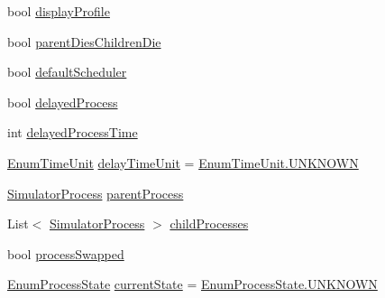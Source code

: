 \begin{DoxyCompactItemize}
\item 
bool \hyperlink{class_c_p_u___o_s___simulator_1_1_operating___system_1_1_simulator_process_a7074283e2d023d83df86651f98da7003}{display\+Profile}
\item 
bool \hyperlink{class_c_p_u___o_s___simulator_1_1_operating___system_1_1_simulator_process_a4be3ead7d12ef8390cc2f0a3a0164efa}{parent\+Dies\+Children\+Die}
\item 
bool \hyperlink{class_c_p_u___o_s___simulator_1_1_operating___system_1_1_simulator_process_ab52228f4f5902049430dc58c0c7408c3}{default\+Scheduler}
\item 
bool \hyperlink{class_c_p_u___o_s___simulator_1_1_operating___system_1_1_simulator_process_a1f62a5a6071d0525b8dea84e9205a591}{delayed\+Process}
\item 
int \hyperlink{class_c_p_u___o_s___simulator_1_1_operating___system_1_1_simulator_process_a17a480e988d10e48af5478b5ebe0794d}{delayed\+Process\+Time}
\item 
\hyperlink{namespace_c_p_u___o_s___simulator_1_1_operating___system_a0553d0bc2513aec52caa769acf994d5c}{Enum\+Time\+Unit} \hyperlink{class_c_p_u___o_s___simulator_1_1_operating___system_1_1_simulator_process_aa2ff3f17dc017fb3ad5285e85661ab47}{delay\+Time\+Unit} = \hyperlink{namespace_c_p_u___o_s___simulator_1_1_operating___system_aea0b669d1bbf5690ae34ac2f8bef9470a696b031073e74bf2cb98e5ef201d4aa3}{Enum\+Time\+Unit.\+U\+N\+K\+N\+O\+W\+N}
\item 
\hyperlink{class_c_p_u___o_s___simulator_1_1_operating___system_1_1_simulator_process}{Simulator\+Process} \hyperlink{class_c_p_u___o_s___simulator_1_1_operating___system_1_1_simulator_process_afd143112dcfa59dbc1cab80f65cf685f}{parent\+Process}
\item 
List$<$ \hyperlink{class_c_p_u___o_s___simulator_1_1_operating___system_1_1_simulator_process}{Simulator\+Process} $>$ \hyperlink{class_c_p_u___o_s___simulator_1_1_operating___system_1_1_simulator_process_a72edfc38a41a74a935147ea8039ea49c}{child\+Processes}
\item 
bool \hyperlink{class_c_p_u___o_s___simulator_1_1_operating___system_1_1_simulator_process_a18f7668d8580b17e1d55bfa124a923cd}{process\+Swapped}
\item 
\hyperlink{namespace_c_p_u___o_s___simulator_1_1_operating___system_a836ee2204e78fcb3a7dd6c3c942b1a24}{Enum\+Process\+State} \hyperlink{class_c_p_u___o_s___simulator_1_1_operating___system_1_1_simulator_process_a0e32f56925bd66039f1a1f5be2003afd}{current\+State} = \hyperlink{namespace_c_p_u___o_s___simulator_1_1_operating___system_aea0b669d1bbf5690ae34ac2f8bef9470a696b031073e74bf2cb98e5ef201d4aa3}{Enum\+Process\+State.\+U\+N\+K\+N\+O\+W\+N}

\end{DoxyCompactItemize}
